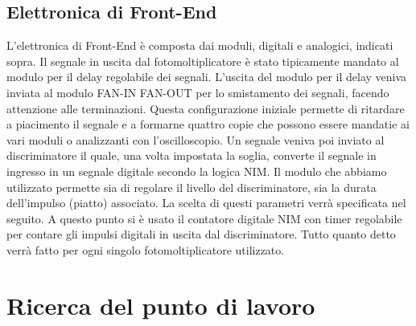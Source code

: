 \documentclass[a4paper,10pt]{article}
\begin{document}
\subsection{Elettronica di Front-End}
L'elettronica di Front-End è composta dai moduli, digitali e analogici, indicati sopra. Il segnale in uscita dal fotomoltiplicatore è stato tipicamente mandato al modulo per il delay regolabile dei segnali. L'uscita del modulo per il delay veniva inviata al modulo FAN-IN FAN-OUT per lo smistamento dei segnali, facendo attenzione alle terminazioni. Questa configurazione iniziale permette di ritardare a piacimento il segnale e a formarne quattro copie che possono essere mandatie ai vari moduli o analizzanti con l'oscilloscopio. Un segnale veniva poi inviato al discriminatore il quale, una volta impostata la soglia, converte il segnale in ingresso in un segnale digitale secondo la logica NIM. Il modulo che abbiamo utilizzato permette sia di regolare il livello del discriminatore, sia la durata dell'impulso (piatto) associato. La scelta di questi parametri verrà specificata nel seguito. A questo punto si è usato il contatore digitale NIM con timer regolabile per contare gli impulsi digitali in uscita dal discriminatore. Tutto quanto detto verrà fatto per ogni singolo fotomoltiplicatore utilizzato. 








\section{Ricerca del punto di lavoro}
\label{sec:puntodilavoro} 
\end{document}
